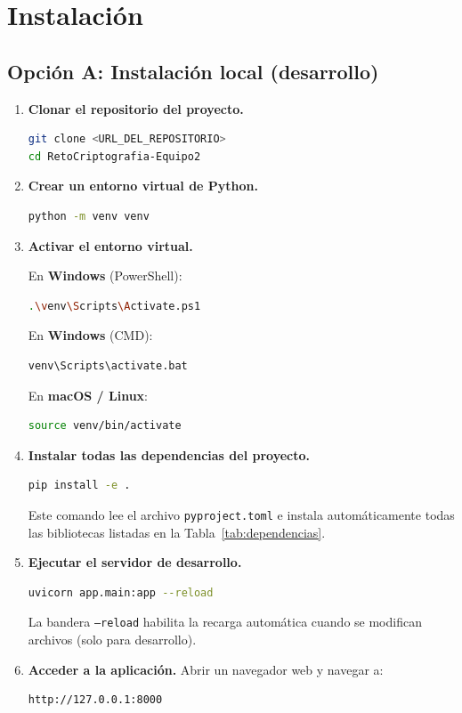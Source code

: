 \documentclass[10pt,letterpaper]{report}
\begin{document}
\chapter{Instalación}

\section{Opción A: Instalación local (desarrollo)}

\begin{enumerate}[leftmargin=2cm]
  \item \textbf{Clonar el repositorio del proyecto.}
  \begin{lstlisting}[language=bash]
git clone <URL_DEL_REPOSITORIO>
cd RetoCriptografia-Equipo2
  \end{lstlisting}

  \item \textbf{Crear un entorno virtual de Python.}
  \begin{lstlisting}[language=bash]
python -m venv venv
  \end{lstlisting}

  \item \textbf{Activar el entorno virtual.}

  En \textbf{Windows} (PowerShell):
  \begin{lstlisting}[language=bash]
.\venv\Scripts\Activate.ps1
  \end{lstlisting}

  En \textbf{Windows} (CMD):
  \begin{lstlisting}[language=bash]
venv\Scripts\activate.bat
  \end{lstlisting}

  En \textbf{macOS / Linux}:
  \begin{lstlisting}[language=bash]
source venv/bin/activate
  \end{lstlisting}

  \item \textbf{Instalar todas las dependencias del proyecto.}
  \begin{lstlisting}[language=bash]
pip install -e .
  \end{lstlisting}
  Este comando lee el archivo \texttt{pyproject.toml} e instala automáticamente todas las bibliotecas listadas en la Tabla~\ref{tab:dependencias}.

  \item \textbf{Ejecutar el servidor de desarrollo.}
  \begin{lstlisting}[language=bash]
uvicorn app.main:app --reload
  \end{lstlisting}
  La bandera \texttt{--reload} habilita la recarga automática cuando se modifican archivos (solo para desarrollo).

  \item \textbf{Acceder a la aplicación.} Abrir un navegador web y navegar a:
  \begin{lstlisting}
http://127.0.0.1:8000
  \end{lstlisting}
\end{enumerate}
\end{document}
